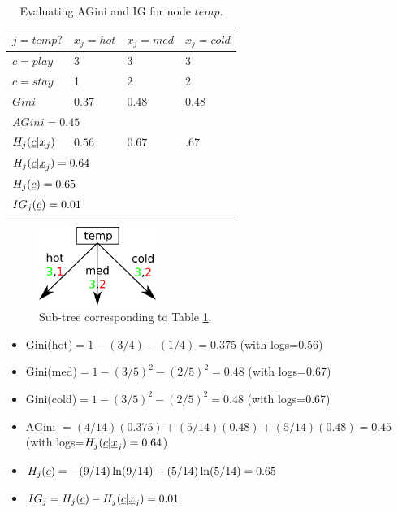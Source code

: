 \begin{table}[h!]
\centering
\begin{tabular}{|l|l|l|l|}
\hline
$j=temp?$ & \cellcolor[HTML]{CBCEFB}$x_j=hot$ & \cellcolor[HTML]{CBCEFB}$x_j=med$ & \cellcolor[HTML]{CBCEFB}$x_j=cold$ \\ \hline
\rowcolor[HTML]{FFFFC7} 
\cellcolor[HTML]{9AFF99}$c=play$ & 3 & 3 & 3 \\ \hline
\rowcolor[HTML]{FFFFC7} 
\cellcolor[HTML]{FFCCC9}$c=stay$ & 1 & 2 & 2 \\ \hline
$Gini$ & 0.37 & 0.48 & 0.48 \\ \hline
\multicolumn{4}{|l|}{$AGini=0.45$} \\ \hline
$H_j(\rvc|x_j)$ & $0.56$ & $0.67$ & $.67$ \\ \hline
\multicolumn{4}{|l|}{$H_j(\rvc|\rvx_j)=0.64$} \\ \hline
\multicolumn{4}{|l|}{$H_j(\rvc)=0.65$} \\ \hline
\multicolumn{4}{|l|}{$IG_j(\rvc)=0.01$} \\ \hline
\end{tabular}
\caption{Evaluating AGini and IG for node $temp$.}
\label{tab-temp-gini}
\end{table}



\begin{figure}[h!]
\centering
\includegraphics[width=1.5in]
{dtree/stump-3children.png}
\caption{Sub-tree
corresponding to Table \ref{tab-temp-gini}.}
\label{fig-stump-3cildren}
\end{figure}



\begin{itemize}
\item Gini(hot)$=1-(3/4)-(1/4)=0.375$ (with logs=0.56)
\item Gini(med)$=1-(3/5)^2-(2/5)^2=0.48$
(with logs=0.67)
\item Gini(cold)$=1-(3/5)^2-(2/5)^2=0.48$
(with logs=0.67)
\item AGini $ = (4/14)(0.375)+
(5/14)(0.48) + (5/14)(0.48) = 0.45 $
(with logs=$H_j(\rvc|\rvx_j)=0.64$)
\item $H_j(\rvc)=-(9/14)\ln (9/14) - (5/14)\ln (5/14) = 0.65$
\item $IG_j=H_j(\rvc)-H_j(\rvc|\rvx_j)=0.01$
\end{itemize}

